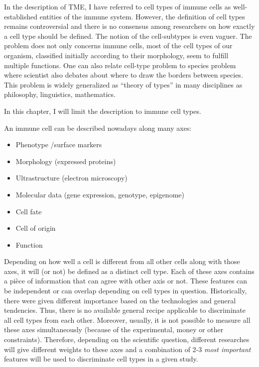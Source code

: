 \documentclass[12pt,]{book}
\providecommand{\tightlist}{%
  \setlength{\itemsep}{0pt}\setlength{\parskip}{0pt}}
\theoremstyle{definition}
\theoremstyle{definition}
\theoremstyle{definition}
\theoremstyle{remark}
\begin{document}
In the description of TME, I have referred to cell types of immune cells
as well-established entities of the immune system. However, the
definition of cell types remains controversial and there is no consensus
among researchers on how exactly a cell type should be defined. The
notion of the cell-subtypes is even vaguer. The problem does not only
concerns immune cells, most of the cell types of our organism,
classified initially according to their morphology, seem to fulfill
multiple functions. One can also relate cell-type problem to species
problem where scientist also debates about where to draw the borders
between species. This problem is widely generalized as ``theory of
types'' \citep{Slater2013} in many disciplines as philosophy,
linguistics, mathematics.

In this chapter, I will limit the description to immune cell types.

An immune cell can be described nowadays along many axes:

\begin{itemize}
\tightlist
\item
  Phenotype /surface markers
\item
  Morphology (expressed proteins)
\item
  Ultrastructure (electron microscopy)
\item
  Molecular data (gene expression, genotype, epigenome)
\item
  Cell fate
\item
  Cell of origin
\item
  Function
\end{itemize}

Depending on how well a cell is different from all other cells along
with those axes, it will (or not) be defined as a distinct cell type.
Each of these axes contains a pièce of information that can agree with
other axis or not. These features can be independent or can overlap
depending on cell types in question. Historically, there were given
different importance based on the technologies and general tendencies.
Thus, there is no available general recipe applicable to discriminate
all cell types from each other. Moreover, usually, it is not possible to
measure all these axes simultaneously (because of the experimental,
money or other constraints). Therefore, depending on the scientific
question, different researches will give different weights to these axes
and a combination of 2-3 \emph{most important} features will be used to
discriminate cell types in a given study.
\end{document}
